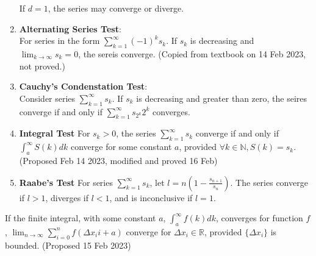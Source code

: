 \documentclass[../note.tex]{subfiles}
\begin{document}
\begin{theorem}
\begin{enumerate}
		If $d=1$, the series may converge or diverge.
	\item \textbf{Alternating Series Test}: \label{AlternatingSeriesTest}\\
		For series in the form $\sum^{\infty}_{k=1}(-1)^{k}s_k$. If $s_k$ is decreasing and $\lim_{k\to \infty} s_k = 0$, the sereis converge. (Copied from textbook on 14 Feb 2023, not proved.)
	\item \label{Cauchy_Condensation_Test} \textbf{Cauchy's Condenstation Test}:\\
		Consider series $\sum^{\infty}_{k=1}s_k$. If ${s_k}$ is decreasing and greater than zero, the seires converge if and only if $\sum^{\infty}_{k=1}s_{2^k}2^k $ converges. 
	\item \textbf{Integral Test}\label{IntegralTest}
		For $s_k>0$, the series $\sum^{\infty}_{k=1}s_k$ converge if and only if $\int_{a}^{\infty}S(k)dk$ converge for some constant $a$, provided $\forall k \in \mathbb{N}, S(k)=s_k$.
		(Proposed Feb 14 2023, modified and proved 16 Feb)
	\item \textbf{Raabe's Test}\label{Raabe's Test}
		For series $\sum^{\infty}_{k=1}s_k$, let $l= \displaystyle n\left(1-\frac{s_{n+1}}{s_n}\right)$. The series converge if $l>1$, diverges if $l<1$, and is inconclusive if $l=1$.

\end{enumerate}
\end{theorem}

\begin{hypothesis}\label{hypothesis:Finite Riamenn Sum}
	If the finite integral, with some constant $a$, $\int_{a}^{\infty}f(k)dk$, converges for function $f$, $\lim_{n \to \infty}\sum^{n}_{i=0} f(\Delta x_ii + a)$ converge for $\Delta x_i \in \mathbb{R}$, provided $\{\Delta x_i\}$ is bounded. (Proposed 15 Feb 2023)
\end{hypothesis}
\end{document}
